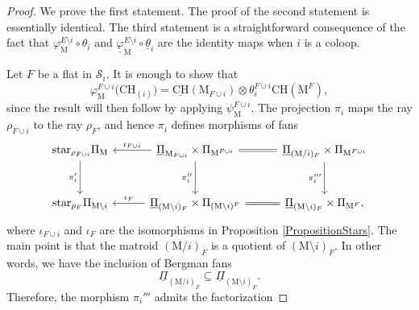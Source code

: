 \documentclass[11pt,reqno]{amsart}
\theoremstyle{definition}
\theoremstyle{remark}
\renewcommand{\(}{\left(}
\renewcommand{\)}{\right)}
\newcommand{\<}{\left<}
\renewcommand{\>}{\right>}
\newcommand{\CH}{\operatorname{CH}}
\begin{document}

\begin{proof} 
We  prove the first statement. The proof of the second statement is essentially identical. %
The third statement is a straightforward consequence of  the fact that  $\varphi^{E \setminus i}_\mathrm{M} \circ \theta_i$ 
and $\underline{\varphi}^{E \setminus i}_\mathrm{M} \circ \underline{\theta}_i$ are the identity maps when $i$ is a coloop.

Let $F$ be a flat in $\mathscr{S}_i$.
It is enough to show that 
\[
\varphi^{F\cup i}_{\mathrm{M}} \big(\mathrm{CH}_{(i)}\big) = \underline{\mathrm{CH}}(\mathrm{M}_{F\cup i}) \otimes \theta_i^{F\cup i} \mathrm{CH}(\mathrm{M}^{F}),
\]
since the result will then follow by applying $\psi_{\mathrm{M}}^{F\cup i}$.
The projection $\pi_i$ maps the ray  $\rho_{F\cup i}$ to the ray $\rho_{F}$,
and hence $\pi_i$ defines  morphisms of fans
\[
\begin{tikzcd}[column sep=10mm, row sep=10mm]
\text{star}_{\rho_{F\cup i}} \Pi_\mathrm{M} \arrow[d, "\pi'_i"'] &\arrow[l, "\iota_{F \cup i}"']  \underline{\Pi}_{\mathrm{M}_{F\cup i}}\times \Pi_{\mathrm{M}^{F\cup i}}  \arrow[d, "\pi''_i"'] & \arrow[l, equal]\underline{\Pi}_{(\mathrm{M}/i)_{F}}\times \Pi_{\mathrm{M}^{F\cup i}} \arrow[d, "\pi'''_i"']\\
\text{star}_{\rho_{F}} \Pi_{\mathrm{M}\setminus i} &  \arrow[l, "\iota_F"'] \underline{\Pi}_{(\mathrm{M}\setminus i)_{F}}\times \Pi_{(\mathrm{M} \setminus i)^F} & \arrow[l, equal] \underline{\Pi}_{(\mathrm{M}\setminus i)_{F}}\times \Pi_{\mathrm{M}^F},
\end{tikzcd}
\]
where $\iota_{F \cup i}$ and $\iota_F$ are the isomorphisms in Proposition \ref{PropositionStars}.
The main point is that the matroid $(\mathrm{M}/i)_F$ is a quotient of $(\mathrm{M}\setminus i)_F$.
In other words, we have the inclusion of Bergman fans
\[
\underline{\Pi}_{(\mathrm{M}/i)_F} \subseteq \underline{\Pi}_{(\mathrm{M}\setminus i)_F}.
\]
Therefore, the morphism $\pi_i'''$ admits the factorization

\end{proof}
\end{document}

